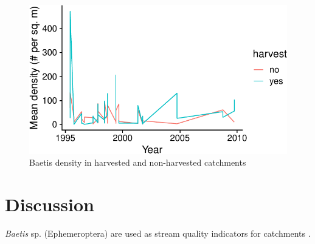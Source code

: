 \documentclass[preprint, 3p,
authoryear]{elsarticle} %
\begin{document}
\begin{figure}[H]

{\centering \includegraphics[width=0.75\linewidth]{Assignment_mockarticle_files/figure-latex/fig1-1} 

}

\caption{\label{fig1}Baetis density in harvested and non-harvested catchments}\label{fig:fig1}
\end{figure}

\hypertarget{discussion}{%
\section{Discussion}\label{discussion}}

\emph{Baetis} sp. (Ephemeroptera) are used as stream quality indicators
for catchments \citep{wallace1986response}.

\renewcommand\refname{References}

\end{document}
